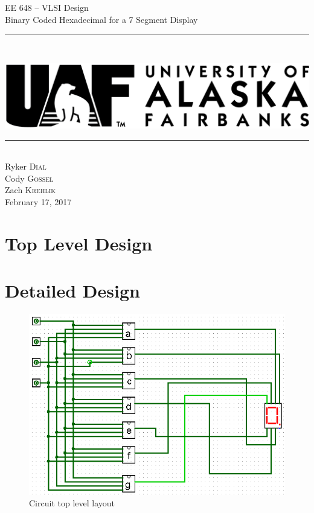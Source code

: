 \documentclass[12pt]{article}
\newcommand{\boldrule}{\rule{\linewidth}{2pt}} %
\begin{document}
\thispagestyle{empty}
\newpage
\vspace*{3cm}
\begin{center}
{\Huge EE 648 -- VLSI Design\\[.5cm]
Binary Coded Hexadecimal for a 7 Segment Display}
\end{center}
\vspace{5mm}
\boldrule\\
\begin{center}
\includegraphics{uaflogo.png}\\[.5cm]
\boldrule\\[3cm]
{\Large
Ryker \textsc{Dial}\\
Cody \textsc{Gossel}\\
Zach \textsc{Krehlik}\\[1cm]
February 17, 2017
}
\end{center}


\newpage

\tableofcontents

\newpage
{}

\section{Top Level Design}

\section{Detailed Design}

\begin{figure}[h]
	\centering
	\label{fig:TopLevelCkt}
	\includegraphics[scale=.8]{topLevelLogicCkt.png}
	\caption{Circuit top level layout}
\end{figure}
\end{document}
